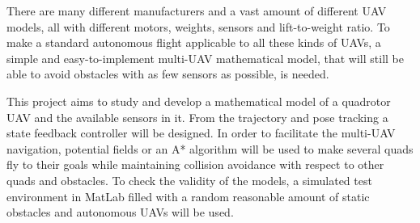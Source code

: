 \documentclass[journal]{IEEEtran}
\begin{document}
	There are many different manufacturers and a vast amount of different UAV models, all with different motors, weights, sensors and lift-to-weight ratio. To make a standard autonomous flight applicable to all these kinds of UAVs, a simple and easy-to-implement multi-UAV mathematical model, that will still be able to avoid obstacles with as few sensors as possible, is needed.
	
	This project aims to study and develop a mathematical model of a quadrotor UAV and the available sensors in it.  From the trajectory and pose tracking a state feedback controller will be designed. In order to facilitate the multi-UAV navigation, potential fields or an A* algorithm will be used to make several quads fly to their goals while maintaining collision avoidance with respect to other quads and obstacles. To check the validity of the models, a simulated test environment in MatLab filled with a random reasonable amount of static obstacles and autonomous UAVs will be used.
	\hfill 
	
	
	
	
	
\end{document}
